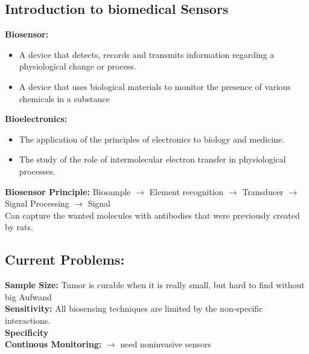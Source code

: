 \documentclass[9pt]{article}
\begin{document}
\fontsize{9.2pt}{10pt}\selectfont


\begin{multicols}{2}

\section{Introduction to biomedical Sensors}
	\textbf{Biosensor:}
	\begin{itemize}
	\item A device that detects, records and transmits information regarding a physiological change or process.
	\item A device that uses biological materials to monitor the presence of various chemicals in a substance
	\end{itemize}
	\textbf{Bioelectronics:}
	\begin{itemize}
	\item The application of the principles of electronics to biology and medicine.
	\item The study of the role of intermolecular electron transfer in physiological processes.
	\end{itemize}
	
\textbf{Biosensor Principle:} Biosample $\rightarrow$ Element recognition $\rightarrow$ Transducer $\rightarrow$ Signal Processing $\rightarrow$ Signal\\
Can capture the wanted molecules with antibodies that were previously created by rats.
	\subsection{Current Problems:}
	\textbf{Sample Size:} Tumor is curable when it is really small, but hard to find without big Aufwand\\
	\textbf{Sensitivity:} All biosensing techniques are limited by the non-specific interactions.\\
	\textbf{Specificity}\\
	\textbf{Continous Monitoring:} $\rightarrow$ need noninvasive sensors

\end{multicols}
\end{document}
